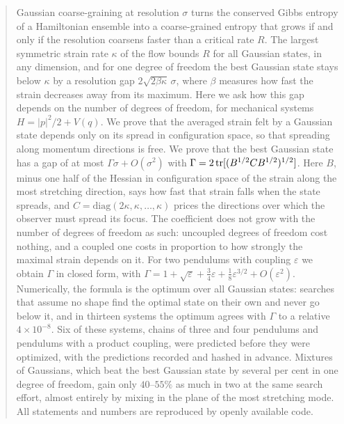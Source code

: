 \begin{abstract}
Gaussian coarse-graining at resolution $\sigma$ turns the conserved Gibbs entropy of a Hamiltonian ensemble into a coarse-grained entropy that grows if and only if the resolution coarsens faster than a critical rate $R$. The largest symmetric strain rate $\kappa$ of the flow bounds $R$ for all Gaussian states, in any dimension, and for one degree of freedom the best Gaussian state stays below $\kappa$ by a resolution gap $2\sqrt{2\beta\kappa}\,\sigma$, where $\beta$ measures how fast the strain decreases away from its maximum. Here we ask how this gap depends on the number of degrees of freedom, for mechanical systems $H = |p|^2/2 + V(q)$. We prove that the averaged strain felt by a Gaussian state depends only on its spread in configuration space, so that spreading along momentum directions is free. We prove that the best Gaussian state has a gap of at most $\Gamma\sigma + O(\sigma^2)$ with $\Gamma = 2\tr[(B^{1/2}CB^{1/2})^{1/2}]$. Here $B$, minus one half of the Hessian in configuration space of the strain along the most stretching direction, says how fast that strain falls when the state spreads, and $C = \mathrm{diag}(2\kappa,\kappa,\dots,\kappa)$ prices the directions over which the observer must spread its focus. The coefficient does not grow with the number of degrees of freedom as such: uncoupled degrees of freedom cost nothing, and a coupled one costs in proportion to how strongly the maximal strain depends on it. For two pendulums with coupling $\varepsilon$ we obtain $\Gamma$ in closed form, with $\Gamma = 1 + \sqrt\varepsilon + \tfrac34\varepsilon + \tfrac18\varepsilon^{3/2} + O(\varepsilon^2)$. Numerically, the formula is the optimum over all Gaussian states: searches that assume no shape find the optimal state on their own and never go below it, and in thirteen systems the optimum agrees with $\Gamma$ to a relative $4\times10^{-8}$. Six of these systems, chains of three and four pendulums and pendulums with a product coupling, were predicted before they were optimized, with the predictions recorded and hashed in advance. Mixtures of Gaussians, which beat the best Gaussian state by several per cent in one degree of freedom, gain only $40$--$55\%$ as much in two at the same search effort, almost entirely by mixing in the plane of the most stretching mode. All statements and numbers are reproduced by openly available code.
\end{abstract}
